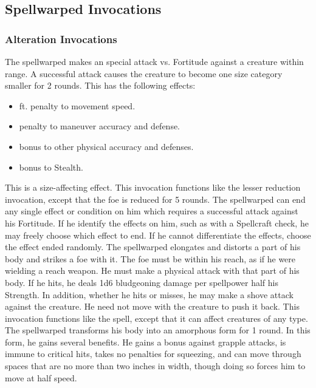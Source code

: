 \subsection{Spellwarped Invocations}\label{Spellwarped Invocations}

\subsubsection{Alteration Invocations}
The spellwarped makes an special attack vs. Fortitude against a creature within \rngclose range.
A successful attack causes the creature to become one size category smaller for 2 rounds.
This has the following effects:
\begin{itemize}
    \item {} ft. penalty to movement speed.
    \item {} penalty to maneuver accuracy and defense.
    \item {} bonus to other physical accuracy and defenses.
    \item {} bonus to Stealth.
\end{itemize}
This is a size-affecting effect.
This invocation functions like the lesser reduction invocation, except that the foe is reduced for 5 rounds.
The spellwarped can end any single effect or condition on him which requires a successful attack against his Fortitude.
If he identify the effects on him, such as with a Spellcraft check, he may freely choose which effect to end.
If he cannot differentiate the effects, choose the effect ended randomly.
The spellwarped elongates and distorts a part of his body and strikes a foe with it.
The foe must be within his reach, as if he were wielding a reach weapon.
He must make a physical attack with that part of his body.
If he hits, he deals 1d6 bludgeoning damage per spellpower \add half his Strength.
In addition, whether he hits or misses, he may make a shove attack against the creature.
He need not move with the creature to push it back.
 This invocation functions like the 
spell, except that it can affect creatures of any type.
The spellwarped transforms his body into an amorphous form for 1 round.
In this form, he gains several benefits.
He gains a  bonus against grapple attacks, is immune to critical hits, takes no penalties for squeezing, and can move through spaces that are no more than two inches in width, though doing so forces him to move at half speed.
